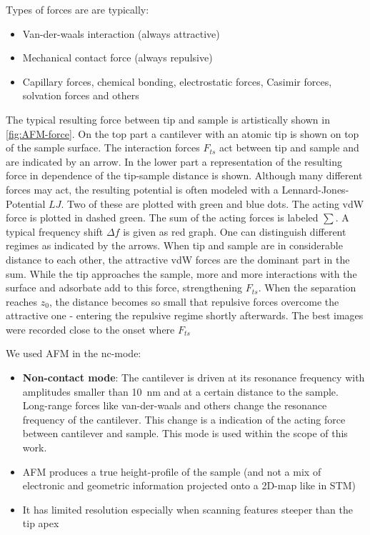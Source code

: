 Types of forces are are typically:
\begin{itemize}
 \item Van-der-waals interaction (always attractive)
 \item Mechanical contact force (always repulsive)
 \item Capillary forces, chemical bonding, electrostatic forces, Casimir forces, solvation forces and others
\end{itemize}

The typical resulting force between tip and sample is artistically shown in \autoref{fig:AFM-force}. On the top part a cantilever with an atomic tip is shown on top of the sample surface. The interaction forces $F_{ts}$ act between tip and sample and are indicated by an arrow. In the lower part a representation of the resulting force in dependence of the tip-sample distance is shown. Although many different forces may act, the resulting potential is often modeled with a Lennard-Jones-Potential $LJ$\cite{jones_determination_1924}. Two of these are plotted with green and blue dots. The acting vdW force is plotted in dashed green. The sum of the acting forces is labeled $\sum$. A typical frequency shift $\Delta f$ is given as red graph. One can distinguish different regimes as indicated by the arrows. When tip and sample are in considerable distance to each other, the attractive vdW forces are the dominant part in the sum. While the tip approaches the sample, more and more interactions with the surface and adsorbate add to this force, strengthening $F_{ts}$. When the separation reaches $z_0$, the distance becomes so small that repulsive forces overcome the attractive one - entering the repulsive regime shortly afterwards. The best images were recorded close to the onset where $F_{ts}$ 

We used AFM in the nc-mode:
\begin{itemize}
  \item \textbf{Non-contact mode}: The cantilever is driven at its resonance frequency with amplitudes smaller than \SI{10}{\nm} and at a certain distance to the sample. Long-range forces like van-der-waals and others change the resonance frequency of the cantilever. This change is a indication of the acting force between cantilever and sample. This mode is used within the scope of this work.
\end{itemize}

\begin{itemize}
 \item AFM produces a true height-profile of the sample (and not a mix of electronic and geometric information projected onto a 2D-map like in STM)
 \item It has limited resolution especially when scanning features steeper than the tip apex
\end{itemize}

